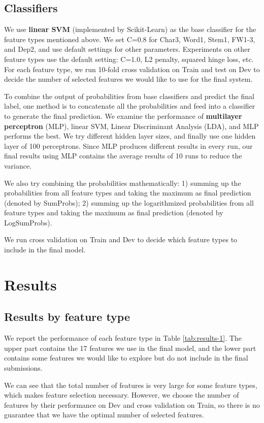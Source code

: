 \documentclass[11pt,letterpaper]{article}
\begin{document}
\subsection{Classifiers}
We use \textbf{linear SVM} (implemented by Scikit-Learn) as the base classifier for the feature types mentioned above. We set C=0.8 for Char3, Word1, Stem1, FW1-3, and Dep2, and use default settings for other parameters. Experiments on other feature types use the default setting: C=1.0, L2 penalty, squared hinge loss, etc. For each feature type, we run 10-fold cross validation on Train and test on Dev to decide the number of selected features we would like to use for the final system. 

To combine the output of probabilities from base classifiers and predict the final label, one method is to concatenate all the probabilities and feed into a classifier to generate the final prediction. We examine the performance of \textbf{multilayer perceptron} (MLP), linear SVM, Linear Discriminant Analysis (LDA), and MLP performs the best. We try different hidden layer sizes, and finally use one hidden layer of 100 perceptrons. Since MLP produces different results in every run, our final results using MLP contains the average results of 10 runs to reduce the variance.

We also try combining the probabilities mathematically: 1) summing up the probabilities from all feature types and taking the maximum as final prediction (denoted by SumProbs); 2) summing up the logarithmized probabilities from all feature types and taking the maximum as final prediction (denoted by LogSumProbs).

We run cross validation on Train and Dev to decide which feature types to include in the final model.


\section{Results}
\label{sec:results}

\subsection{Results by feature type}
We report the performance of each feature type in Table \ref{tab:results-1}. The upper part contains the 17 features we use in the final model, and the lower part contains some features we would like to explore but do not include in the final submissions. 

We can see that the total number of features is very large for some feature types, which makes feature selection necessary. However, we choose the number of features by their performance on Dev and cross validation on Train, so there is no guarantee that we have the optimal number of selected features.
\end{document}
